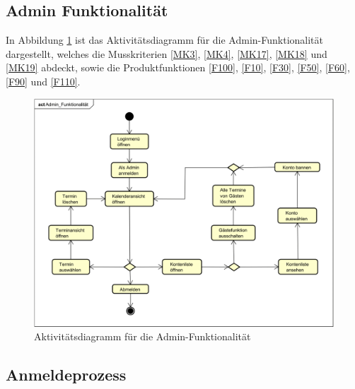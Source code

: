 \subsection{Admin Funktionalität}
In Abbildung \ref{fig:activity_diagram_admin} ist das Aktivitätsdiagramm für die Admin-Funktionalität dargestellt,
welches die Musskriterien \ref{MK3}, \ref{MK4}, \ref{MK17}, \ref{MK18} und \ref{MK19} abdeckt,
sowie die Produktfunktionen \ref{F100}, \ref{F10}, \ref{F30}, \ref{F50}, \ref{F60}, \ref{F90} und \ref{F110}.
\begin{figure}[ht]
    \centering
    \includegraphics[width=\textwidth]{figures/activitydiagrams/adminfunk}
    \caption{Aktivitätsdiagramm für die Admin-Funktionalität}
    \label{fig:activity_diagram_admin}
\end{figure}
\clearpage
\subsection{Anmeldeprozess}

